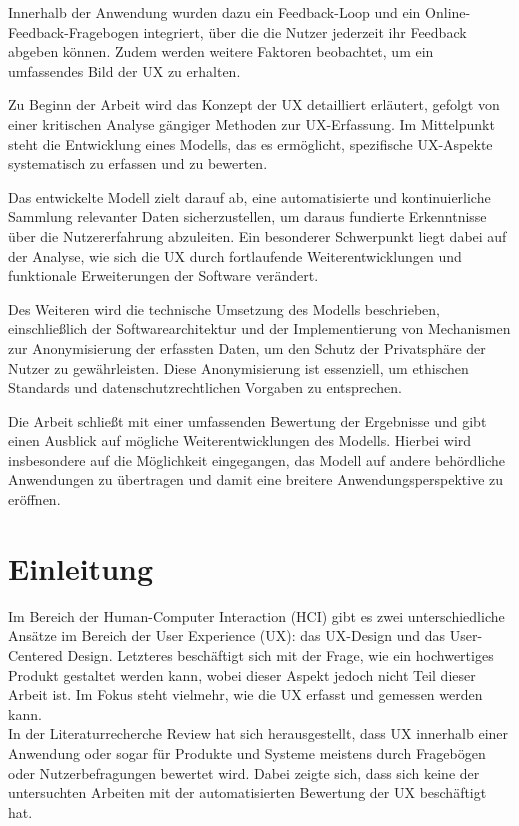 \documentclass[12pt,oneside]{article}
\begin{document}
Innerhalb der Anwendung wurden dazu ein Feedback-Loop und ein Online-Feedback-Fragebogen integriert, über die die Nutzer jederzeit ihr Feedback abgeben können. Zudem werden weitere Faktoren beobachtet, um ein umfassendes Bild der UX zu erhalten.

Zu Beginn der Arbeit wird das Konzept der UX detailliert erläutert, gefolgt von einer kritischen Analyse gängiger Methoden zur UX-Erfassung. Im Mittelpunkt steht die Entwicklung eines Modells, das es ermöglicht, spezifische UX-Aspekte systematisch zu erfassen und zu bewerten.

Das entwickelte Modell zielt darauf ab, eine automatisierte und kontinuierliche Sammlung relevanter Daten sicherzustellen, um daraus fundierte Erkenntnisse über die Nutzererfahrung abzuleiten. Ein besonderer Schwerpunkt liegt dabei auf der Analyse, wie sich die UX durch fortlaufende Weiterentwicklungen und funktionale Erweiterungen der Software verändert.

Des Weiteren wird die technische Umsetzung des Modells beschrieben, einschließlich der Softwarearchitektur und der Implementierung von Mechanismen zur Anonymisierung der erfassten Daten, um den Schutz der Privatsphäre der Nutzer zu gewährleisten. Diese Anonymisierung ist essenziell, um ethischen Standards und datenschutzrechtlichen Vorgaben zu entsprechen.

Die Arbeit schließt mit einer umfassenden Bewertung der Ergebnisse und gibt einen Ausblick auf mögliche Weiterentwicklungen des Modells. Hierbei wird insbesondere auf die Möglichkeit eingegangen, das Modell auf andere behördliche Anwendungen zu übertragen und damit eine breitere Anwendungsperspektive zu eröffnen.

\section{Einleitung}
Im Bereich der Human-Computer Interaction (HCI) gibt es zwei unterschiedliche Ansätze im Bereich der User Experience (UX): das UX-Design und das User-Centered Design\cite{glanznig}. Letzteres beschäftigt sich mit der Frage, wie ein hochwertiges Produkt gestaltet werden kann, wobei dieser Aspekt jedoch nicht Teil dieser Arbeit ist. Im Fokus steht vielmehr, wie die UX erfasst und gemessen werden kann.\\
In der Literaturrecherche Review hat sich herausgestellt, dass UX  innerhalb einer Anwendung oder sogar für Produkte und Systeme meistens durch Fragebögen oder Nutzerbefragungen bewertet wird. Dabei zeigte sich, dass sich keine der untersuchten Arbeiten mit der automatisierten Bewertung der UX beschäftigt hat.
\end{document}
